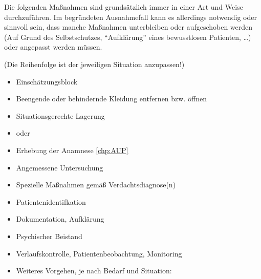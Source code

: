 \documentclass[
ngerman,
paper=a4,
asymmetric,
fontsize=10pt,
headings=small,
draft=false,
numbers=noenddot,
bibtotocnumbered,
footnotes=multiple,
]{scrreprt}
\begin{document}
{\label{m:standardmassnahmen-immer}}{%
Die folgenden Maßnahmen sind grundsätzlich immer in einer  Art und Weise durchzuführen. Im begründeten Ausnahmefall kann es
allerdings notwendig oder sinnvoll sein, dass manche Maßnahmen unterbleiben oder
aufgeschoben werden (Auf Grund des Selbstschutzes, \enquote{Aufklärung} eines bewusstlosen Patienten,
\ldots{}) oder angepasst werden müssen.

{\scriptsize (Die Reihenfolge ist der jeweiligen Situation anzupassen!)}
\begin{itemize}
  \item Einschätzungsblock 
  \item Beengende oder behindernde Kleidung entfernen bzw.
  öffnen
  \item Situationsgerechte Lagerung
  \item {} oder 
  \item Erhebung der Anamnese \ref{chp:AUP}
  \item Angemessene Untersuchung 
  \item Spezielle Maßnahmen gemäß Verdachtsdiagnose(n)
  \item Patientenidentifkation
  \item Dokumentation, Aufklärung
  \item Psychischer Beistand
  \item Verlaufskontrolle, Patientenbeobachtung, Monitoring
  \columnbreak
  \item Weiteres Vorgehen, je nach Bedarf und Situation:
  
  
 

\end{itemize}}
\end{document}
